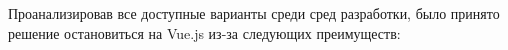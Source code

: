 \documentclass[a4paper,14pt,oneside]{extreport}
\begin{document}



Проанализировав все доступные варианты среди сред разработки, было принято решение остановиться на Vue.js из-за следующих преимуществ:
\end{document}
